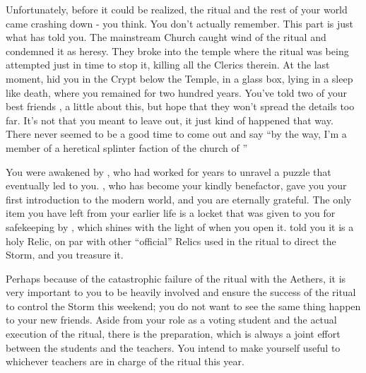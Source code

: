 \documentclass[char]{GL2020}
\begin{document}
Unfortunately, before it could be realized, the ritual and the rest of your world came crashing down - you think. You don't actually remember. This part is just what \cWildCard{} has told you. The mainstream Church caught wind of the ritual and condemned it as heresy. They broke into the temple where the ritual was being attempted just in time to stop it, killing all the Clerics therein. At the last moment, \cDisneyMentor{} hid you in the Crypt below the Temple, in a glass box, lying in a sleep like death, where you remained for two hundred years. You've told two of your best friends \cPirateChild{}, \cTechStar{} a little about this, but hope that they won't spread the details too far. It's not that you meant to leave \cAdopted{} out, it just kind of happened that way. There never seemed to be a good time to come out and say ``by the way, I'm a member of a heretical splinter faction of the church of \cFarmGod{}''

You were awakened by \cWildCard{}, who had worked for years to unravel a puzzle that eventually led \cWildCard{\them} to you. \cWildCard{}, who has become your kindly benefactor, gave you your first introduction to the modern world, and you are eternally grateful. The only item you have left from your earlier life is a locket that was given to you for safekeeping by \cDisneyMentor{}, which shines with the light of \cFarmGod{} when you open it. \cDisneyMentor{} told you it is a holy Relic, on par with other ``official'' Relics used in the ritual to direct the Storm, and you treasure it. 

Perhaps because of the catastrophic failure of the ritual with the Aethers, it is very important to you to be heavily involved and ensure the success of the ritual to control the Storm this weekend; you do not want to see the same thing happen to your new friends. Aside from your role as a voting student and the actual execution of the ritual, there is the preparation, which is always a joint effort between the students and the teachers. You intend to make yourself useful to whichever teachers are in charge of the ritual this year. 
\end{document}
